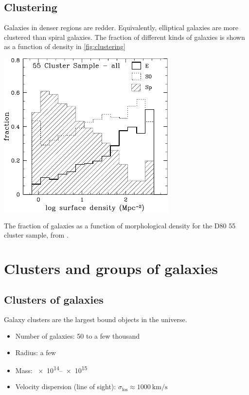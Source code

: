 \subsection{Clustering}
Galaxies in denser regions are redder.
Equivalently, elliptical galaxies are more clustered than spiral galaxies.
The fraction of different kinds of galaxies is shown as a function of density in \cref{fig:clustering}
\begin{marginfigure}
	\includegraphics[width=\textwidth]{img/ch-05/clustering.pdf}
	\caption{The fraction of galaxies as a function of morphological density for the D80 55 cluster sample, from \cite{Dressler_1997}.}
	\label{fig:clustering}
\end{marginfigure}







\section{Clusters and groups of galaxies}

\subsection{Clusters of galaxies}
Galaxy clusters are the largest bound objects in the universe.
\begin{itemize}
	\item Number of galaxies: 50 to a few thousand
	\item Radius: a few \si{\mega\parsec}
	\item Mass: \SIrange{e14}{e15}{\solarmass}
	\item Velocity dispersion (line of sight): $\sigma_\text{los} \approx \SI{1000}{\kilo\metre\per\second}$
\end{itemize}

